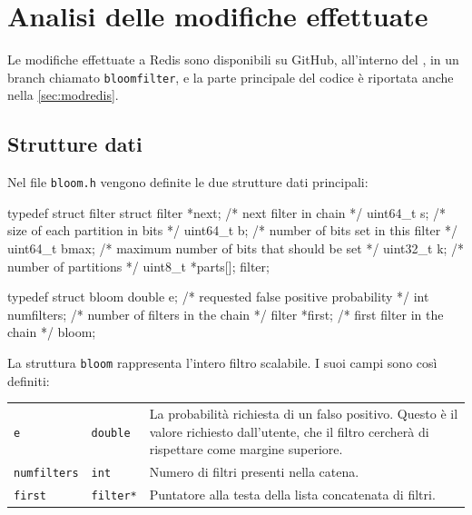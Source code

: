 \section{Analisi delle modifiche effettuate}
\label{sec:patchexplain}

Le modifiche effettuate a Redis sono disponibili su GitHub, all'interno del
, in un branch
chiamato \verb|bloomfilter|, e la parte principale del codice è riportata anche
nella \autoref{sec:modredis}.

\subsection{Strutture dati}

Nel file \verb|bloom.h| vengono definite le due strutture dati principali:

\begin{commentedsource}[style=csource,caption=Strutture dati,label={lst:bloomStruct}]
typedef struct filter {
    struct filter *next;  /* next filter in chain */
    uint64_t s;           /* size of each partition in bits */
    uint64_t b;           /* number of bits set in this filter */
    uint64_t bmax;        /* maximum number of bits that should be set */
    uint32_t k;           /* number of partitions */
    uint8_t *parts[];
} filter;

typedef struct bloom {
	double e;             /* requested false positive probability */
	int numfilters;       /* number of filters in the chain */
	filter *first;        /* first filter in the chain */
} bloom;
\end{commentedsource}

La struttura \verb|bloom| rappresenta l'intero filtro scalabile. I suoi campi sono
così definiti:

\medskip
\begin{tabular}{ |l|l|p{280pt}| }
  \hline
  \verb|e| & \verb|double| & La probabilità richiesta di un falso positivo. Questo è il valore richiesto
  dall'utente, che il filtro cercherà di rispettare come margine superiore. \\

  \verb|numfilters| & \verb|int| & Numero di filtri presenti nella catena. \\

  \verb|first| & \verb|filter*| & Puntatore alla testa della lista concatenata di filtri. \\
  \hline
\end{tabular}
\medskip

